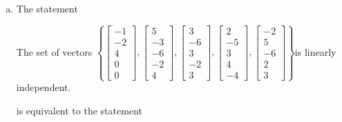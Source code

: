 \begin{exerciseAnswer}
\begin{enumerate}[(a)]
\item The statement 
\begin{center}\begin{minipage}{0.8\textwidth}
 The set of vectors \( \left\{ \left[\begin{array}{c}
-1 \\
-2 \\
4 \\
0 \\
0
\end{array}\right] , \left[\begin{array}{c}
5 \\
-3 \\
-6 \\
-2 \\
4
\end{array}\right] , \left[\begin{array}{c}
3 \\
-6 \\
3 \\
-2 \\
3
\end{array}\right] , \left[\begin{array}{c}
2 \\
-5 \\
3 \\
4 \\
-4
\end{array}\right] , \left[\begin{array}{c}
-2 \\
5 \\
-6 \\
2 \\
3
\end{array}\right] \right\} \)is linearly independent.
\end{minipage}\end{center}
     is equivalent to the statement 
\begin{center}\begin{minipage}{0.8\textwidth}
 The vector equation \( x_{1} \left[\begin{array}{c}
-1 \\
-2 \\
4 \\
0 \\
0
\end{array}\right] + x_{2} \left[\begin{array}{c}
5 \\
-3 \\

\end{array}
\end{minipage}
\end{center}
\end{enumerate}
\end{exerciseAnswer}
